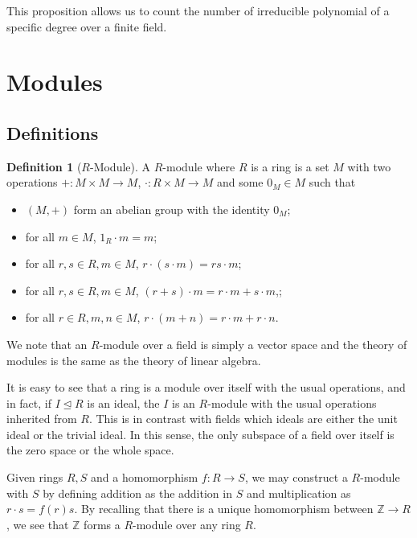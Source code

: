 \documentclass[]{article}
\theoremstyle{definition}
\theoremstyle{definition}
\newtheorem{definition}{Definition}[section]
\begin{document}
This proposition allows us to count the number of irreducible polynomial of 
a specific degree over a finite field.

\newpage
\section{Modules}

\subsection{Definitions}

\begin{definition}[\(R\)-Module]
  A \(R\)-module where \(R\) is a ring is a set \(M\) with two operations 
  \(+ : M \times M \to M\), \(\cdot : R \times M \to M\) and some 
  \(0_M \in M\) such that 
  \begin{itemize}
    \item \((M, +)\) form an abelian group with the identity \(0_M\);
    \item for all \(m \in M\), \(1_R \cdot m = m\);
    \item for all \(r, s \in R, m \in M\), \(r \cdot (s \cdot m) = rs \cdot m\);
    \item for all \(r, s \in R, m \in M\), 
      \((r + s) \cdot m = r \cdot m + s \cdot m\),;
    \item for all \(r \in R, m, n \in M\),
      \(r \cdot (m + n) = r \cdot m + r \cdot n\).
  \end{itemize}
\end{definition}

We note that an \(R\)-module over a field is simply a vector space and the 
theory of modules is the same as the theory of linear algebra.

It is easy to see that a ring is a module over itself with the usual operations, 
and in fact, if \(I \trianglelefteq R\) is an ideal, the \(I\) is an 
\(R\)-module with the usual operations inherited from \(R\). This is in contrast 
with fields which ideals are either the unit ideal or the trivial ideal. In this 
sense, the only subspace of a field over itself is the zero space or the whole 
space.

Given rings \(R, S\) and a homomorphism \(f : R \to S\), we may construct a 
\(R\)-module with \(S\) by defining addition as the addition in \(S\) and 
multiplication as \(r \cdot s = f(r)s\). By recalling that there is a unique 
homomorphism between \(\mathbb{Z} \to R\), we see that \(\mathbb{Z}\) forms 
a \(R\)-module over any ring \(R\).
\end{document}
